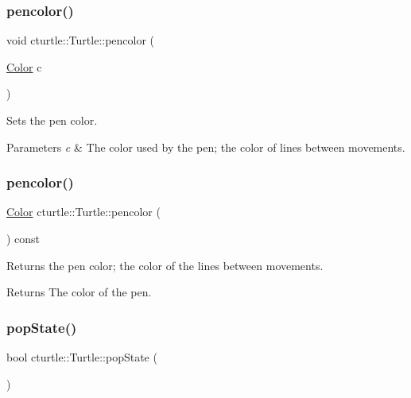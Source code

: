 \subsubsection{\texorpdfstring{pencolor()}{pencolor()}\hspace{0.1cm}{\footnotesize\ttfamily [1/2]}}
{\footnotesize\ttfamily void cturtle\+::\+Turtle\+::pencolor (\begin{DoxyParamCaption}\item[{\hyperlink{classcturtle_1_1Color}{Color}}]{c }\end{DoxyParamCaption})\hspace{0.3cm}{\ttfamily [inline]}}



Sets the pen color. 


\begin{DoxyParams}{Parameters}
{\em c} & The color used by the pen; the color of lines between movements. \\
\hline
\end{DoxyParams}
\mbox{\label{classcturtle_1_1Turtle_ab14dd65bd0e882b815755656072a9cdd}} 
\subsubsection{\texorpdfstring{pencolor()}{pencolor()}\hspace{0.1cm}{\footnotesize\ttfamily [2/2]}}
{\footnotesize\ttfamily \hyperlink{classcturtle_1_1Color}{Color} cturtle\+::\+Turtle\+::pencolor (\begin{DoxyParamCaption}{ }\end{DoxyParamCaption}) const\hspace{0.3cm}{\ttfamily [inline]}}



Returns the pen color; the color of the lines between movements. 

\begin{DoxyReturn}{Returns}
The color of the pen. 
\end{DoxyReturn}
\mbox{\label{classcturtle_1_1Turtle_a5c30156bce0af41ff3d66ecb30017dff}} 
\subsubsection{\texorpdfstring{pop\+State()}{popState()}}
{\footnotesize\ttfamily bool cturtle\+::\+Turtle\+::pop\+State (\begin{DoxyParamCaption}{ }\end{DoxyParamCaption})\hspace{0.3cm}{\ttfamily [protected]}}

